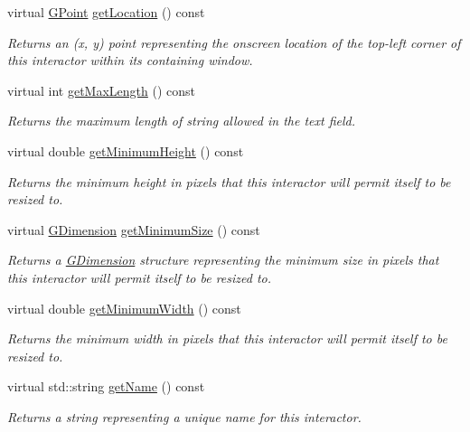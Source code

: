 \begin{DoxyCompactItemize}
virtual \mbox{\hyperlink{classGPoint}{G\+Point}} \mbox{\hyperlink{classGInteractor_a4f83802015511edeb63b892830812c11}{get\+Location}} () const
\begin{DoxyCompactList}\small\item\em Returns an (x, y) point representing the onscreen location of the top-\/left corner of this interactor within its containing window. \end{DoxyCompactList}\item 
virtual int \mbox{\hyperlink{classGTextField_a465e41b66da9e75443bf0b7951582468}{get\+Max\+Length}} () const
\begin{DoxyCompactList}\small\item\em Returns the maximum length of string allowed in the text field. \end{DoxyCompactList}\item 
virtual double \mbox{\hyperlink{classGInteractor_aed4b0075fcc434499c3cb3e46896bda3}{get\+Minimum\+Height}} () const
\begin{DoxyCompactList}\small\item\em Returns the minimum height in pixels that this interactor will permit itself to be resized to. \end{DoxyCompactList}\item 
virtual \mbox{\hyperlink{classGDimension}{G\+Dimension}} \mbox{\hyperlink{classGInteractor_a66b5af0b32493b4d597ca0a3df2049ea}{get\+Minimum\+Size}} () const
\begin{DoxyCompactList}\small\item\em Returns a \mbox{\hyperlink{classGDimension}{G\+Dimension}} structure representing the minimum size in pixels that this interactor will permit itself to be resized to. \end{DoxyCompactList}\item 
virtual double \mbox{\hyperlink{classGInteractor_a59e668114fe3d49d2a0f28deb258f7c8}{get\+Minimum\+Width}} () const
\begin{DoxyCompactList}\small\item\em Returns the minimum width in pixels that this interactor will permit itself to be resized to. \end{DoxyCompactList}\item 
virtual std\+::string \mbox{\hyperlink{classGInteractor_a8a60438a5b55d0b2ceb35c8674b9d8c5}{get\+Name}} () const
\begin{DoxyCompactList}\small\item\em Returns a string representing a unique name for this interactor. \end{DoxyCompactList}\item 

\end{DoxyCompactItemize}
